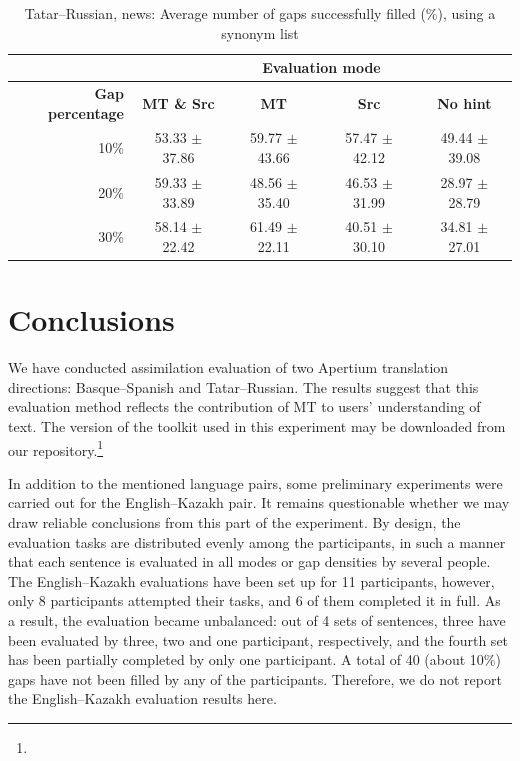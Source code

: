 \documentclass[11pt]{article}
\newcommand{\comment}[1]{\marginpar{\scriptsize\sf \textcolor{blue}{#1}}}
\begin{document}
\begin{table}
\centering
\begin{tabular}{|r |*{4}{c}|}
\hline
  &\multicolumn{4}{c|}{\textbf{Evaluation mode}}\\
\hline
\textbf{Gap percentage} & \textbf{MT \& Src} & \textbf{MT} & \textbf{Src} & \textbf{No hint} \\
10\%&53.33 \(\pm\) 37.86&59.77 \(\pm\) 43.66&57.47 \(\pm\) 42.12&49.44 \(\pm\) 39.08\\
20\%&59.33 \(\pm\) 33.89&48.56 \(\pm\) 35.40&46.53 \(\pm\) 31.99&28.97 \(\pm\) 28.79\\
30\%&58.14 \(\pm\) 22.42&61.49 \(\pm\) 22.11&40.51 \(\pm\) 30.10&34.81 \(\pm\) 27.01\\
\hline
\end{tabular}
\caption {Tatar--Russian, news: Average number of gaps successfully filled (\%), using a synonym list} \label{table:rus-news} 
\end{table}

\section{Conclusions}
\label{sec:conclusion}
We have conducted assimilation evaluation of two Apertium translation directions: Basque--Spanish and Tatar--Russian. The results suggest that this evaluation method reflects the contribution of MT to users' understanding of text. The version of the toolkit used in this 
\comment{EA to JA: by our repository I mean my github, is that ok?}
experiment may be downloaded from our repository.\footnote{}\comment{MLF: Do the same as in the other GitHUb comment above}

In addition to the mentioned language pairs, some preliminary experiments were carried out for the English--Kazakh pair. It remains questionable whether we may draw reliable conclusions from this part of the experiment. By design, the evaluation tasks are distributed evenly among the participants, in such a manner that each sentence is evaluated in all modes or gap densities by several people. The English--Kazakh evaluations have been set up for 11 participants, however, only 8 participants attempted their tasks, and 6 of them completed it in full. As a result, the evaluation became unbalanced: out of 4 sets of sentences, three have been evaluated by three, two and one participant, respectively, and the fourth set has been partially completed by only one participant. A total of 40 (about 10\%) gaps have not been filled by any of the participants. Therefore, we do not report the English--Kazakh evaluation results here.
\end{document}
